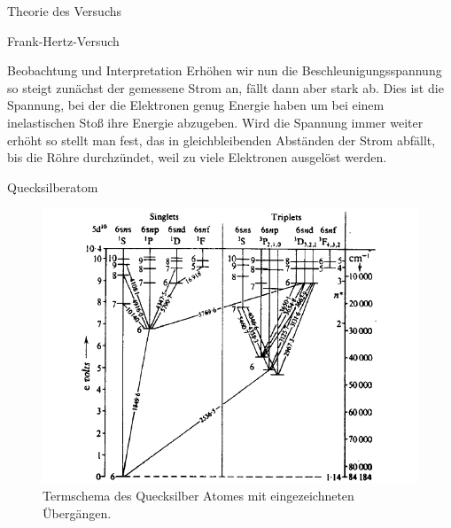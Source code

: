 \documentclass[pdftex, a4paper,11pt, twoside, ngerman]{report}
\begin{document}
\begin{chapter}{Theorie des Versuchs}
\begin{section}{Frank-Hertz-Versuch}
      
      
      \begin{subsection}{Beobachtung und Interpretation}
        Erhöhen wir nun die Beschleunigungsspannung so steigt zunächst der
        gemessene Strom an, fällt dann aber stark ab. Dies ist die Spannung,
        bei der die Elektronen genug Energie haben um bei einem inelastischen
        Stoß ihre Energie abzugeben. Wird die Spannung immer weiter erhöht so
        stellt man fest, das in gleichbleibenden Abständen der Strom abfällt,
        bis die Röhre durchzündet, weil zu viele Elektronen ausgelöst werden. 

      \end{subsection}
      
      
      
      \begin{subsection}{Quecksilberatom}
        
        
        \begin{figure}[ht]
        \centering
        \includegraphics[width=\textwidth]
    {Figures/termschema2.png}
        \caption{Termschema des Quecksilber Atomes mit eingezeichneten
        Übergängen.}
        \label{fig:termschema2}
      \end{figure}
      \end{subsection}
      
    \end{section}
    
  \end{chapter}
         
\end{document}
